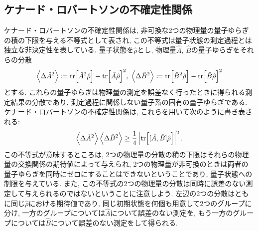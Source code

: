 \subsection{ケナード・ロバートソンの不確定性関係}
ケナード・ロバートソンの不確定性関係は, 非可換な2つの物理量の量子ゆらぎの積の下限を与える不等式として表され, この不等式は量子状態の測定過程とは独立な非決定性を表している. 量子状態を\(\hat{\rho}\)とし, 物理量\(\hat{A},\,\hat{B}\)の量子ゆらぎをそれらの分散
\begin{equation}
  \ev{\Delta \hat{A}^2}\coloneqq \tr[\hat{A}^2\hat{\rho}]-\tr[\hat{A}\hat{\rho}]^2,\hspace{1mm}\ev{\Delta \hat{B}^2}\coloneqq \tr[\hat{B}^2\hat{\rho}]-\tr[\hat{B}\hat{\rho}]^2
\end{equation}
とする. これらの量子ゆらぎは物理量の測定を誤差なく行ったときに得られる測定結果の分散であり, 測定過程に関係しない量子系の固有の量子ゆらぎである. ケナード・ロバートソンの不確定性関係は, これらを用いて次のように書き表される:
\begin{equation}
  \ev{\Delta\hat{A}^2}\ev{\Delta\hat{B}^2}\geq\frac{1}{4}\left|\tr[[\hat{A},\hat{B}]\hat{\rho}]\right|^2.
\end{equation}
この不等式が意味するところは, 2つの物理量の分散の積の下限はそれらの物理量の交換関係の期待値によって与えられ, 2つの物理量が非可換のときは両者の量子ゆらぎを同時にゼロにすることはできないということであり, 量子状態への制限を与えている. また, この不等式の2つの物理量の分散は同時に誤差のない測定して与えられるのではないということに注意しよう. 左辺の2つの分散はともに同じ\(\hat{\rho}\)における期待値であり, 同じ初期状態を何個も用意して2つのグループに分け, 一方のグループについては\(\hat{A}\)について誤差のない測定を, もう一方のグループについては\(\hat{B}\)について誤差のない測定をして得られる. 

